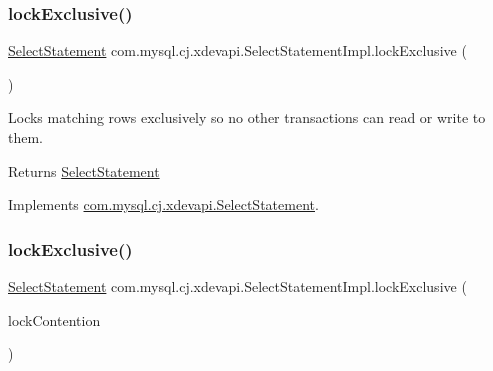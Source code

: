 \mbox{\label{classcom_1_1mysql_1_1cj_1_1xdevapi_1_1_select_statement_impl_a53aaa86b0305024bdd172a02e975b006}} 
\subsubsection{\texorpdfstring{lock\+Exclusive()}{lockExclusive()}\hspace{0.1cm}{\footnotesize\ttfamily [1/2]}}
{\footnotesize\ttfamily \mbox{\hyperlink{interfacecom_1_1mysql_1_1cj_1_1xdevapi_1_1_select_statement}{Select\+Statement}} com.\+mysql.\+cj.\+xdevapi.\+Select\+Statement\+Impl.\+lock\+Exclusive (\begin{DoxyParamCaption}{ }\end{DoxyParamCaption})}

Locks matching rows exclusively so no other transactions can read or write to them.

\begin{DoxyReturn}{Returns}
\mbox{\hyperlink{interfacecom_1_1mysql_1_1cj_1_1xdevapi_1_1_select_statement}{Select\+Statement}} 
\end{DoxyReturn}


Implements \mbox{\hyperlink{interfacecom_1_1mysql_1_1cj_1_1xdevapi_1_1_select_statement_a86b185579eb689c07a5691ba33c59821}{com.\+mysql.\+cj.\+xdevapi.\+Select\+Statement}}.

\mbox{\label{classcom_1_1mysql_1_1cj_1_1xdevapi_1_1_select_statement_impl_afbaa870747c558133a85fcc536658503}} 
\subsubsection{\texorpdfstring{lock\+Exclusive()}{lockExclusive()}\hspace{0.1cm}{\footnotesize\ttfamily [2/2]}}
{\footnotesize\ttfamily \mbox{\hyperlink{interfacecom_1_1mysql_1_1cj_1_1xdevapi_1_1_select_statement}{Select\+Statement}} com.\+mysql.\+cj.\+xdevapi.\+Select\+Statement\+Impl.\+lock\+Exclusive (\begin{DoxyParamCaption}\item[{Lock\+Contention}]{lock\+Contention }\end{DoxyParamCaption})}

